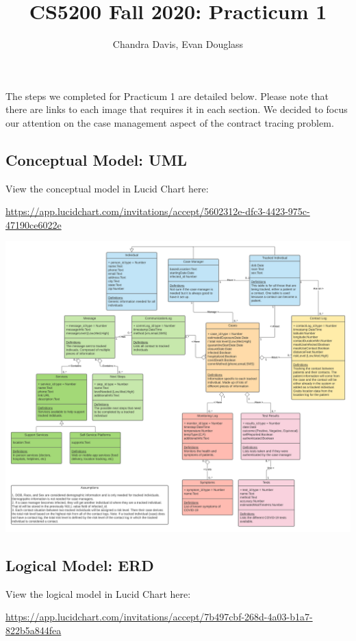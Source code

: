 \documentclass[
]{article}
\title{CS5200 Fall 2020: Practicum 1}
\author{Chandra Davis, Evan Douglass}
\date{}
\begin{document}
\maketitle

The steps we completed for Practicum 1 are detailed below. Please note
that there are links to each image that requires it in each section. We
decided to focus our attention on the case management aspect of the
contract tracing problem.

\hypertarget{conceptual-model-uml}{%
\subsection{Conceptual Model: UML}\label{conceptual-model-uml}}

View the conceptual model in Lucid Chart here:

\url{https://app.lucidchart.com/invitations/accept/5602312e-dfc3-4423-975c-47190ce6022e}

\includegraphics{imgs/CS5200 - Practicum 1_UML.png}\\

\hypertarget{logical-model-erd}{%
\subsection{Logical Model: ERD}\label{logical-model-erd}}

View the logical model in Lucid Chart here:

\url{https://app.lucidchart.com/invitations/accept/7b497cbf-268d-4a03-b1a7-822b5a844fea}
\end{document}
